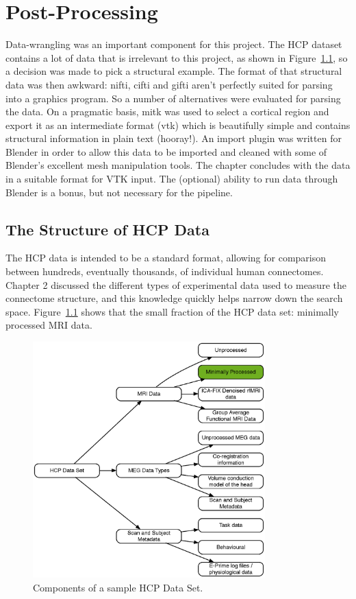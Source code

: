 \documentclass[MSc,paper=a4,pagesize=auto]{icldt}
\begin{document}
\chapter{Post-Processing}
Data-wrangling was an important component for this project. The HCP dataset contains a lot of data that is irrelevant to this project, as shown in Figure~\ref{fig:hcp_full_data_set}, so a decision was made to pick a structural example.  The format of that structural data was then awkward: nifti, cifti and gifti aren't perfectly suited for parsing into a graphics program. So a number of alternatives were evaluated for parsing the data. On a pragmatic basis, mitk was used to select a cortical region and export it as an intermediate format (vtk) which is beautifully simple and contains structural information in plain text (hooray!). An import plugin was written for Blender in order to allow this data to be imported and cleaned with some of Blender's excellent mesh manipulation tools. The chapter concludes with the data in a suitable format for VTK input. The (optional) ability to run data through Blender is a bonus, but not necessary for the pipeline.

\section{The Structure of HCP Data}
The HCP data is intended to be a standard format, allowing for comparison between hundreds, eventually thousands, of individual human connectomes. Chapter 2 discussed the different types of experimental data used to measure the connectome structure, and this knowledge quickly helps narrow down the search space. Figure~\ref{fig:hcp_full_data_set} shows that the small fraction of the HCP data set: minimally processed MRI data.  

\begin{figure}[htbp!]
    \centering
    \includegraphics[width=0.8\textwidth]{resources/hcp_full_data_set}
    \caption{Components of a sample HCP Data Set.}
    \label{fig:hcp_full_data_set}
\end{figure}
\end{document}
